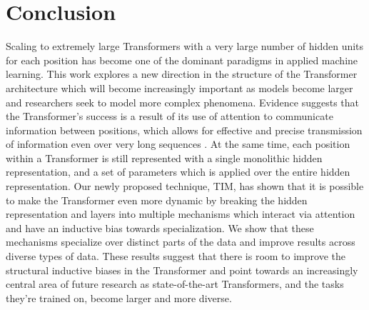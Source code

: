 \documentclass{article}
\begin{document}





\vspace{-5mm}
\section{Conclusion}
\vspace{-1mm}

Scaling to extremely large Transformers with a very large number of hidden units for each position has become one of the dominant paradigms in applied machine learning. This work explores a new direction in the structure of the Transformer architecture which will become increasingly important as models become larger and researchers seek to model more complex phenomena.  Evidence suggests that the Transformer's success is a result of its use of attention to communicate information between positions, which allows for effective and precise transmission of information even over very long sequences \citep{kaplan2020scaling}.  At the same time, each position within a Transformer is still represented with a single monolithic hidden representation, and a set of parameters which is applied over the entire hidden representation.  Our newly proposed technique, TIM, has shown that it is possible to make the Transformer even more dynamic by breaking the hidden representation and layers into multiple mechanisms which interact via attention and have an inductive bias towards specialization.  We show that these mechanisms specialize over distinct parts of the data and improve results across diverse types of data.  These results suggest that there is room to improve the structural inductive biases in the Transformer and point towards an increasingly central area of future research as state-of-the-art Transformers, and the tasks they're trained on, become larger and more diverse.  
\end{document}
